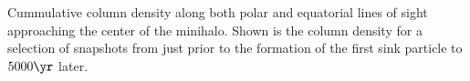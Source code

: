 Cummulative column density along both polar and equatorial lines of sight approaching the center of the minihalo.  Shown is the column density for a selection of snapshots from just prior to the formation of the first sink particle to $5000\yr$ later.